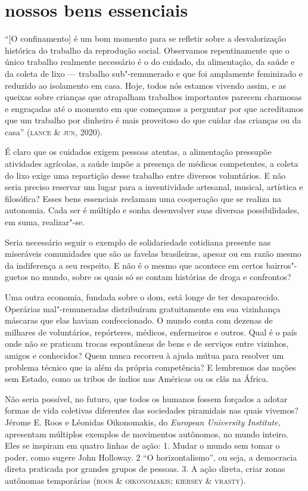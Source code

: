 \section{nossos bens essenciais}

``{[}O confinamento{]} é um bom momento para se refletir sobre a
desvalorização histórica do trabalho da reprodução social. Observamos
repentinamente que o único trabalho realmente necessário é o do cuidado,
da alimentação, da saúde e da coleta de lixo --- trabalho sub"-remunerado
e que foi amplamente feminizado e reduzido ao isolamento em casa. Hoje,
todos nós estamos vivendo assim, e as queixas sobre crianças que
atrapalham trabalhos importantes parecem charmosas e engraçadas até o
momento em que começamos a perguntar por que acreditamos que um trabalho
por dinheiro é mais proveitoso do que cuidar das crianças ou da casa''
(\textsc{lance} \& \textsc{jun}, 2020).

É claro que os cuidados exigem pessoas atentas, a alimentação pressupõe
atividades agrícolas, a saúde impõe a presença de médicos competentes, a
coleta do lixo exige uma repartição desse trabalho entre diversos
voluntários. E não seria preciso reservar um lugar para a inventividade
artesanal, musical, artística e filosófica? Esses bens essenciais
reclamam uma cooperação que se realiza na autonomia. Cada ser é múltiplo
e sonha desenvolver suas diversas possibilidades, em suma, realizar"-se.

Seria necessário seguir o exemplo de solidariedade cotidiana presente
nas miseráveis comunidades que são as favelas brasileiras, apesar ou em
razão mesmo da indiferença a seu respeito. E não é o mesmo que acontece
em certos bairros"-guetos no mundo, sobre os quais só se contam histórias
de droga e confrontos?

Uma outra economia, fundada sobre o dom, está longe de ter desaparecido.
Operárias mal"-remuneradas distribuíram gratuitamente em sua vizinhança
máscaras que elas haviam confeccionado. O mundo conta com dezenas de
milhares de voluntários, repórteres, médicos, enfermeiros e outros. Qual
é o país onde não se praticam trocas espontâneas de bens e de serviços
entre vizinhos, amigos e conhecidos? Quem nunca recorreu à ajuda mútua
para resolver um problema técnico que ia além da própria competência? E
lembremos das nações sem Estado, como as tribos de índios nas Américas
ou os clãs na África.

Não seria possível, no futuro, que todos os humanos fossem forçados a
adotar formas de vida coletivas diferentes das sociedades piramidais nas
quais vivemos? Jérome E. Roos e Léonidas Oikonomakis, do \emph{European
University Institute,} apresentam múltiplos exemplos de movimentos
autônomos, no mundo inteiro. Eles se inspiram em quatro linhas de ação:
1. Mudar o mundo sem tomar o poder, como sugere John Holloway. 2 ``O
horizontalismo'', ou seja, a democracia direta praticada por grandes
grupos de pessoas. 3. A ação direta, criar zonas autônomas temporárias
(\textsc{roos} \& \textsc{oikonomakis}; \textsc{kiersey} \& \textsc{vrasty}).

